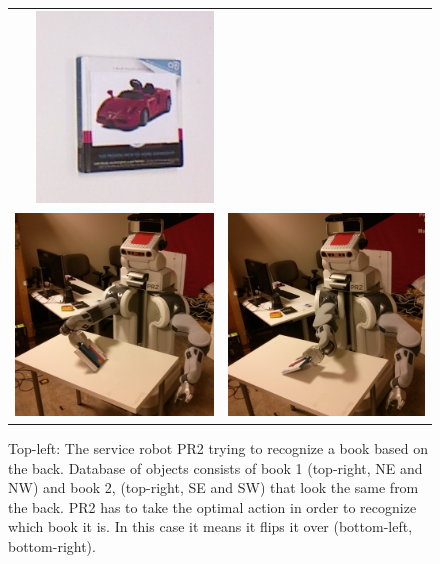 \begin{figure}[ht]
\begin{tabular}{cccc}
    &\includegraphics[width=0.23\columnwidth]{pics/first_cover2.jpg} \\
    \multicolumn{2}{c}{\includegraphics[width=0.45\columnwidth]{pics/pr2_grasp.jpg}}
    & \multicolumn{2}{c}{\includegraphics[width=0.45\columnwidth]{pics/pr2_rotate.jpg}}
    \end{tabular}
    \caption{Top-left: The service robot PR2 trying to recognize a book based on the back. Database of objects consists of book 1 (top-right, NE and NW) and book 2, (top-right, SE and SW) that look the same from the back. PR2 has to take the optimal action in order to recognize which book it is. In this case it means it flips it over (bottom-left, bottom-right).}
    \vspace{-4ex}

    \label{fig:pr2}
    \end{figure}

